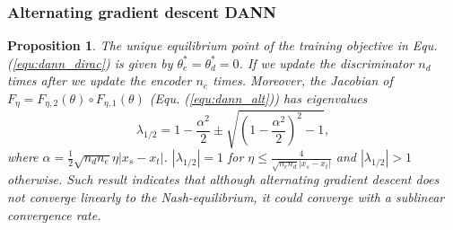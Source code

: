 \documentclass{article} \usepackage{iclr2023_conference,times}
\newtheorem{prop}{Proposition}
\newcommand{\myref}[1]{Equ. (\ref{#1})}
\begin{document}
\subsubsection{Alternating gradient descent DANN}
\begin{prop}
The unique equilibrium point of the training objective in \myref{equ:dann_dirac} is given by $\theta^*_e=\theta^*_d=0$. If we update the discriminator $n_d$ times after we update the encoder $n_e$ times. Moreover, the Jacobian of $F_\eta=F_{\eta,2}(\theta)\circ F_{\eta,1}(\theta)$ (\myref{equ:dann_alt}) has eigenvalues
\begin{equation}
  \lambda_{1/2}=1-\frac{\alpha^2}{2}\pm\sqrt{\left(1-\frac{\alpha^2}{2}\right)^2-1},
\end{equation}
where $\alpha=\frac{1}{2}\sqrt{n_dn_e}\eta|x_s-x_t|$. $|\lambda_{1/2}|=1$ for $\eta\leq\frac{4}{\sqrt{n_en_d}|x_s-x_t|}$ and $|\lambda_{1/2}|>1$ otherwise. Such result indicates that although alternating gradient descent does not converge linearly to the Nash-equilibrium, it could converge with a sublinear convergence rate. 
\label{prop:altdann}
\end{prop}
\end{document}
